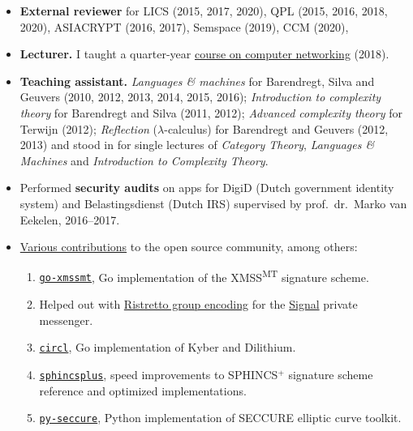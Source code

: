 \documentclass{article}
\newcommand\partitle[1]{\vskip20pt\par\noindent{\textsf{\textbf{#1}}}}
\begin{document}
\partitle{Other relevant experience}
\begin{itemize}
    \item \textbf{External reviewer}
            for LICS (2015, 2017, 2020), QPL (2015, 2016, 2018, 2020),
            ASIACRYPT (2016, 2017), Semspace (2019), CCM (2020),
    \item \textbf{Lecturer.}
        I taught a quarter-year
            \href{https://www.ru.nl/studiegids/science/vm/osirislinks/ibc/nwi-ibc021/}{course on computer networking} (2018).
    \item \textbf{Teaching assistant.}
        \emph{Languages \& machines} for Barendregt, Silva and Geuvers
        (2010, 2012, 2013, 2014, 2015, 2016);
        \emph{Introduction to complexity theory}
        for Barendregt and Silva (2011, 2012);
        \emph{Advanced complexity theory}
        for Terwijn (2012);
        \emph{Reflection} ($\lambda$-calculus) for Barendregt and Geuvers
        (2012, 2013) and stood in for single lectures
        of \emph{Category Theory}, \emph{Languages \& Machines}
        and \emph{Introduction to Complexity Theory}.
    \item Performed \textbf{security audits}
        on apps for DigiD (Dutch government identity system)
        and Belastingsdienst (Dutch IRS) supervised by prof.~dr.~Marko van Eekelen,
        2016--2017.
    \item \href{https://github.com/bwesterb}{Various contributions} to the open source community, among others:
        \begin{enumerate}
            \item \href{https://github.com/bwesterb/go-xmssmt}{\texttt{go-xmssmt}}, Go implementation of the XMSS\textsuperscript{MT}
                        signature scheme.
                \item Helped out with
        \href{https://github.com/signalapp/curve25519-dalek/commit/c2320e9137ab1d02234620ed4f3b22371f688db2}{Ristretto
                    group encoding} for the \href{https://signal.org/en/}{Signal} private messenger.
            \item \href{https://github.com/cloudflare/circl}{\texttt{circl}}, Go implementation of
                    Kyber and Dilithium.
            \item \href{https://github.com/sphincs/sphincsplus}{\texttt{sphincsplus}},
                    speed improvements to SPHINCS$^+$ signature scheme reference and optimized implementations.
            \item \href{https://github.com/bwesterb/py-seccure}{\texttt{py-seccure}}, Python implementation of SECCURE elliptic curve toolkit.

\end{enumerate}
\end{itemize}
\end{document}
